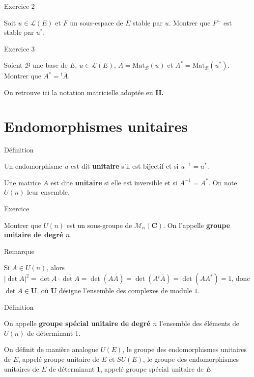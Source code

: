 \documentclass[a4paper,11pt]{article}
\newcommand{\C}{\mathbf{C}}
\newcommand{\U}{\mathbf{U}}
\newcommand{\M}{\mathcal{M}}
\newcommand{\B}{\mathcal{B}}
\renewcommand{\L}{\mathcal{L}}
\newenvironment{gbar}[1]{%
		\def\FrameCommand{{\color{#1}\vrule width 3pt }
		\colorbox{gris2}} %
		\MakeFramed{\advance\hsize -\width\FrameRestore}} %
		{\endMakeFramed}
\newenvironment{cadre}[2]{
		\begin{bclogo}[couleur = gris , barre = none , noborder = true , logo=\vspace{1em}]{
			\hspace{.14em}
			\colorbox{#1}{
				\parbox{15em}{
				\sffamily\normalsize{\color{gris}#2}
			}}
			\vspace{.2em}
		}
			\begin{gbar}{#1}
	}
	{
			\end{gbar}
		\end{bclogo}
	}
\begin{document}
\begin{cadre}{jaune}{Exercice 2}
Soit $u\in\L(E)$ et $F$ un sous-espace de $E$ stable par $u$. Montrer que $F^\perp$ est stable par $u^*$.
\end{cadre}

\begin{cadre}{jaune}{Exercice 3}
Soient $\B$ une base de $E$, $u\in\L(E)$, $A=\mathrm{Mat}_\B(u)$ et $A^*=\mathrm{Mat}_\B(u^*)$. Montrer que $A^*={}^t\overline{A}$.
\end{cadre}
On retrouve ici la notation matricielle adoptée en {\sffamily\color{vert1}\textbf{II.}}

\section{Endomorphismes unitaires}
\begin{cadre}{bleu}{Définition}
Un endomorphisme $u$ est dit {\sffamily\textbf{\color{bleu}unitaire}} s'il est bijectif et si $u^{-1}=u^*$.

Une matrice $A$ est dite {\sffamily\textbf{\color{bleu}unitaire}} si elle est inversible et si $A^{-1}=A^*$. On note $U(n)$ leur ensemble.
\end{cadre}
\begin{cadre}{jaune}{Exercice}
Montrer que $U(n)$ est un sous-groupe de $\M_n(\C)$. On l'appelle  {\sffamily\textbf{\color{jaune}groupe unitaire de degré $n$}}.
\end{cadre}
\begin{cadre}{noir}{Remarque}
Si $A\in U(n)$, alors $\vert\det A\vert^2=\det A\cdot\overline{\det A}=\det (A\overline{A})=\det (A{}^t\overline{A})=\det(AA^*)=1$, donc $\det A\in\U$, où $\U$ désigne l'ensemble des complexes de module $1$.
\end{cadre}
\begin{cadre}{bleu}{Définition}
On appelle {\sffamily\textbf{\color{bleu}groupe spécial unitaire de degré $n$}} l'ensemble des éléments de $U(n)$ de déterminant $1$.
\end{cadre}

On définit de manière analogue $U(E)$, le groupe des endomorphismes unitaires de $E$, appelé groupe unitaire de $E$ et $SU(E)$, le groupe des endomorphismes unitaires de $E$ de déterminant $1$, appelé groupe spécial unitaire de $E$.
\end{document}
